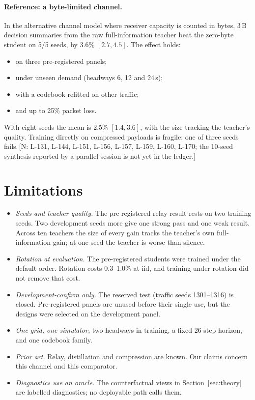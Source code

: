 \documentclass[11pt]{article}
\theoremstyle{definition}
\newif\ifshownotes\shownotestrue
\newcommand{\NOTE}[1]{\ifshownotes{\color{notecol}\,\textsf{\footnotesize[N: #1]}}\fi}
\begin{document}
\paragraph{Reference: a byte-limited channel.} In the alternative channel model where receiver capacity is counted in
bytes, 3\,B decision summaries from the raw full-information teacher beat the zero-byte student on 5/5 seeds, by $3.6\%$
$[2.7,4.5]$. The effect holds:
\begin{itemize}
\item on three pre-registered panels;
\item under unseen demand (headways 6, 12 and 24\,s);
\item with a codebook refitted on other traffic;
\item and up to 25\% packet loss.
\end{itemize}
With eight seeds the mean is $2.5\%$ $[1.4,3.6]$, with the size tracking the teacher's quality. Training directly on
compressed payloads is fragile: one of three seeds fails.\NOTE{L-131, L-144, L-151, L-156, L-157, L-159, L-160, L-170;
the 10-seed synthesis reported by a parallel session is not yet in the ledger.}

\section{Limitations}\label{sec:limits}
\begin{itemize}
\item \emph{Seeds and teacher quality.} The pre-registered relay result rests on two training seeds. Two development
seeds more give one strong pass and one weak result. Across ten teachers the size of every gain tracks the teacher's own
full-information gain; at one seed the teacher is worse than silence.
\item \emph{Rotation at evaluation.} The pre-registered students were trained under the default order. Rotation costs
0.3--1.0\% at iid, and training under rotation did not remove that cost.
\item \emph{Development-confirm only.} The reserved test (traffic seeds 1301--1316) is closed. Pre-registered panels
are unused before their single use, but the designs were selected on the development panel.
\item \emph{One grid, one simulator,} two headways in training, a fixed 26-step horizon, and one codebook family.
\item \emph{Prior art.} Relay, distillation and compression are known. Our claims concern this channel and this
comparator.
\item \emph{Diagnostics use an oracle.} The counterfactual views in Section~\ref{sec:theory} are labelled diagnostics;
no deployable path calls them.
\end{itemize}
\end{document}
